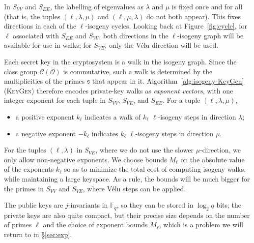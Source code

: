 \documentclass{llncs}
\newcommand{\F}{\mathbb{F}}
\newcommand{\Cl}{\mathcal{C}}
\renewcommand{\O}{\mathcal{O}}
\newcommand{\algstyle}[1]{\textsc{#1}}
\renewcommand{\frak}{\mathfrak}
\begin{document}
In $S_{VV}$ and $S_{EE}$,
the labelling of eigenvalues as $\lambda$ and $\mu$ 
is fixed once and for all 
(that is, the tuples $(\ell,\lambda,\mu)$ and $(\ell,\mu,\lambda)$ do not
both appear).
This fixes directions in each of the $\ell$-isogeny cycles.
Looking back at Figure~\ref{fig:cycle}, 
for $\ell$ associated with $S_{EE}$ and $S_{VV}$, 
both directions in the $\ell$-isogeny graph will be available for use in
walks; for $S_{VE}$, only the Vélu direction will be used.

Each secret key in the cryptosystem is a walk in the isogeny graph.
Since the class group $\Cl(\O)$ is commutative, 
such a walk is determined by the multiplicities of the primes $\frak{s}$
that appear in it.
Algorithm~\ref{alg:isogeny-KeyGen} (\algstyle{KeyGen})
therefore encodes private-key walks as \emph{exponent vectors},
with one integer exponent for each tuple in $S_{VV}$, $S_{VE}$, and $S_{EE}$.
For a tuple $(\ell,\lambda,\mu)$,
\begin{itemize}
    \item
a positive exponent $k_\ell$ indicates a walk of $k_\ell$ $\ell$-isogeny
steps in direction $\lambda$;
\item
a negative exponent $-k_\ell$ indicates $k_\ell$
$\ell$-isogeny steps in direction $\mu$.
\end{itemize}
For the tuples $(\ell,\lambda)$ in $S_{VE}$, 
where we do not use the slower $\mu$-direction,
we only allow non-negative exponents.
We choose bounds $M_\ell$ on the absolute value of the exponents $k_\ell$
so as to minimize the total cost of computing isogeny walks, 
while maintaining a large keyspace.
As a rule, the bounds will be much bigger for the primes
in $S_{VV}$ and $S_{VE}$, where Vélu steps can be applied.

The public keys are $j$-invariants in $\F_q$,
so they can be stored in $\log_2 q$ bits;
the private keys are also quite compact,
but their precise size depends on the number of primes $\ell$
and the choice of exponent bounds $M_\ell$,
which is a problem we will return to in \S\ref{sec:exp}.
\end{document}
